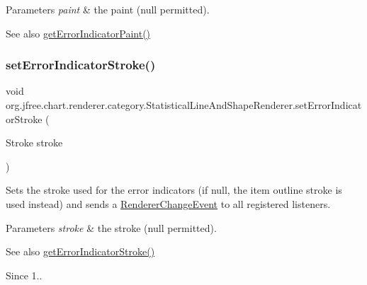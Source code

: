 \begin{DoxyParams}{Parameters}
{\em paint} & the paint ({\ttfamily null} permitted).\\
\hline
\end{DoxyParams}
\begin{DoxySeeAlso}{See also}
\mbox{\hyperlink{classorg_1_1jfree_1_1chart_1_1renderer_1_1category_1_1_statistical_line_and_shape_renderer_ab44c842ea85e2436b2d32698acc19555}{get\+Error\+Indicator\+Paint()}} 
\end{DoxySeeAlso}
\mbox{\label{classorg_1_1jfree_1_1chart_1_1renderer_1_1category_1_1_statistical_line_and_shape_renderer_a488c9add706c96aa5fb2e4fcb00a7a1c}} 
\subsubsection{\texorpdfstring{set\+Error\+Indicator\+Stroke()}{setErrorIndicatorStroke()}}
{\footnotesize\ttfamily void org.\+jfree.\+chart.\+renderer.\+category.\+Statistical\+Line\+And\+Shape\+Renderer.\+set\+Error\+Indicator\+Stroke (\begin{DoxyParamCaption}\item[{Stroke}]{stroke }\end{DoxyParamCaption})}

Sets the stroke used for the error indicators (if {\ttfamily null}, the item outline stroke is used instead) and sends a \mbox{\hyperlink{}{Renderer\+Change\+Event}} to all registered listeners.


\begin{DoxyParams}{Parameters}
{\em stroke} & the stroke ({\ttfamily null} permitted).\\
\hline
\end{DoxyParams}
\begin{DoxySeeAlso}{See also}
\mbox{\hyperlink{classorg_1_1jfree_1_1chart_1_1renderer_1_1category_1_1_statistical_line_and_shape_renderer_aa75d2c78f34a50fbf11a89fc26bb78af}{get\+Error\+Indicator\+Stroke()}}
\end{DoxySeeAlso}
\begin{DoxySince}{Since}
1.. 
\end{DoxySince}


